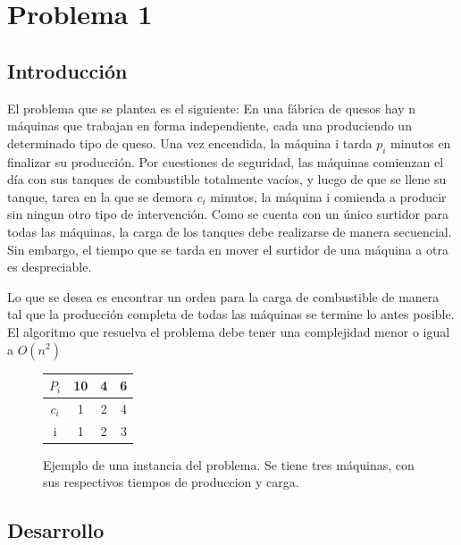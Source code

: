 \section{Problema 1}
 
\subsection{Introducci\'on}
El problema que se plantea es el siguiente: 
En una f\'abrica de quesos hay n m\'aquinas que trabajan en forma independiente, cada una produciendo un
determinado tipo de queso. Una vez encendida, la m\'aquina i tarda $p_i$ minutos en finalizar su producci\'on.
Por cuestiones de seguridad, las m\'aquinas comienzan el d\'ia con sus tanques de combustible totalmente vac\'ios, y
 luego de que se llene su tanque, tarea en la que se demora $c_i$ minutos, la m\'aquina i comienda a producir sin ningun otro tipo de intervenci\'on.
Como se cuenta con un \'unico surtidor para todas las m\'aquinas, la carga de los tanques debe realizarse de manera secuencial.
Sin embargo, el tiempo que se tarda en mover el surtidor de una m\'aquina a otra es despreciable.

Lo que se desea es encontrar un orden para la carga de combustible de manera tal que la producci\'on completa de
todas las m\'aquinas se termine lo antes posible. El algoritmo que resuelva el problema debe tener una complejidad menor o igual a $O(n^2)$

\vspace{2em}
\begin{figure}[h!]
    \begin{center}
		\centering
		\begin{tabular}[c]{|c|c|c|c|}
		    \hline
		    $P_i$ & 10 & 4 & 6 \\
		    \hline
		    $c_i$ &  1 & 2 & 4  \\
		    \hline
		    \rowcolor[gray]{.9}
		    i & 1 & 2 & 3  \\
		    \hline
		\end{tabular}
		\caption{Ejemplo de una instancia del problema. Se tiene tres m\'aquinas, con sus respectivos tiempos de produccion y carga.}   
		\label{fig:ej1Ejemplos}
    \end{center}
\end{figure}
 
 
\subsection{Desarrollo}
 

